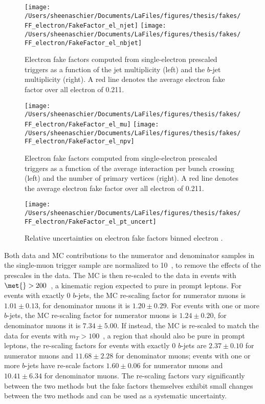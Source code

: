 \begin{figure}[tbp]
  \centering
  \texttt{[image: /Users/sheenaschier/Documents/LaFiles/figures/thesis/fakes/FF\_electron/FakeFactor\_el\_njet]}
  \texttt{[image: /Users/sheenaschier/Documents/LaFiles/figures/thesis/fakes/FF\_electron/FakeFactor\_el\_nbjet]}\\
  \caption{Electron fake factors computed from single-electron prescaled triggers as a function of the jet multiplicity (left) and the $b$-jet multiplicity (right). A red line denotes the average electron fake factor over all electron \pt{} of 0.211.}
  \label{fig:elec_FF_njet}
\end{figure}


\begin{figure}[tbp]
  \centering
  \texttt{[image: /Users/sheenaschier/Documents/LaFiles/figures/thesis/fakes/FF\_electron/FakeFactor\_el\_mu]}
  \texttt{[image: /Users/sheenaschier/Documents/LaFiles/figures/thesis/fakes/FF\_electron/FakeFactor\_el\_npv]}\\
  \caption{Electron fake factors computed from single-electron prescaled triggers as a function of the average interaction per bunch crossing (left) and the number of primary vertices (right). A red line denotes the average electron fake factor over all electron \pt{} of 0.211.}
  \label{fig:elec_FF_pileup}
\end{figure}

\begin{figure}[tbp]
  \centering
  \texttt{[image: /Users/sheenaschier/Documents/LaFiles/figures/thesis/fakes/FF\_electron/FakeFactor\_el\_pt\_uncert]}\\
  \caption{Relative uncertainties on electron fake factors binned electron \pt{}.}
  \label{fig:elec_FF_rel_uncert}
\end{figure}

 \FloatBarrier



Both data and MC contributions to the numerator and denominator samples in the single-muon trigger sample are normalized to 10~\ipb, to remove the effects of the prescales in the data.  The MC is then re-scaled to the data in events with $\met{}>200$~\GeV, a kinematic region expected to pure in prompt leptons.  For events with exactly 0 $b$-jets, the MC re-scaling factor for numerator muons is $1.01 \pm 0.13$, for denominator muons it is $1.20\pm 0.29$. For events with one or more $b$-jets, the MC re-scaling factor for numerator muons is $1.24 \pm 0.20$, for denominator muons it is $7.34\pm 5.00$. If instead, the MC is re-scaled to match the data for events with $m_{T} > 100$~\GeV, a region that should also be pure in prompt leptons, the re-scaling factors for events with exactly 0 $b$-jets are $2.37 \pm 0.10$ for numerator muons and $11.68 \pm 2.28$ for denominator muons; events with one or more $b$-jets have re-scale factors $1.60 \pm 0.06$ for numerator muons and $10.41 \pm 6.34$ for denominator muons. The re-scaling factors vary significantly between the two methods but the fake factors themselves exhibit small changes between the two methods and can be used as a systematic uncertainty.

